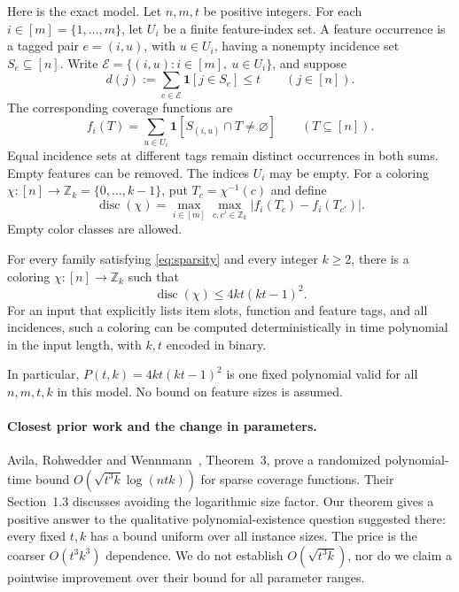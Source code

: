 \documentclass[acmsmall,11pt,nonacm]{acmart}
\newcommand{\ind}{\mathbf{1}}
\newcommand{\disc}{\operatorname{disc}}
\newcommand{\Zk}{\mathbb{Z}_k}
\newcommand{\calE}{\mathcal{E}}
\begin{document}
Here is the exact model. Let $n,m,t$ be positive integers. For each
$i\in[m]=\{1,\ldots,m\}$, let $U_i$ be a finite feature-index set. A feature
occurrence is a tagged pair $e=(i,u)$, with $u\in U_i$, having a nonempty
incidence set $S_e\subseteq[n]$. Write
$\calE=\{(i,u):i\in[m],\ u\in U_i\}$, and suppose
\begin{equation}
 d(j):=\sum_{e\in\calE}\ind[j\in S_e]\le t
 \qquad (j\in[n]).
 \label{eq:sparsity}
\end{equation}
The corresponding coverage functions are
\begin{equation}
 f_i(T)=\sum_{u\in U_i}\ind[S_{(i,u)}\cap T\ne\varnothing]
 \qquad (T\subseteq[n]).
 \label{eq:coverage}
\end{equation}
Equal incidence sets at different tags remain distinct occurrences in
both sums. Empty features can be removed. The indices $U_i$ may be empty.
For a coloring $\chi:[n]\to\Zk=\{0,\ldots,k-1\}$, put
$T_c=\chi^{-1}(c)$ and define
\[
 \disc(\chi)=\max_{i\in[m]}\max_{c,c'\in\Zk}
          |f_i(T_c)-f_i(T_{c'})|.
\]
Empty color classes are allowed.

\begin{theorem}
\label{thm:main}
For every family satisfying \eqref{eq:sparsity} and every integer $k\ge2$,
there is a coloring $\chi:[n]\to\Zk$ such that
\begin{equation}
 \disc(\chi)\le 4kt(kt-1)^2.
 \label{eq:bound}
\end{equation}
For an input that explicitly lists item slots, function and feature tags,
and all incidences, such a coloring can be computed deterministically in
time polynomial in the input length, with $k,t$ encoded in binary.
\end{theorem}

In particular, $P(t,k)=4kt(kt-1)^2$ is one fixed polynomial valid for all
$n,m,t,k$ in this model. No bound on feature sizes is assumed.

\paragraph{Closest prior work and the change in parameters.}
Avila, Rohwedder and Wennmann~\cite{ARW26}, Theorem~3, prove a randomized
polynomial-time bound
$O(\sqrt{t^3k}\log(ntk))$ for sparse coverage functions. Their
Section~1.3 discusses avoiding the logarithmic size factor. Our theorem
gives a positive answer to the qualitative polynomial-existence question
suggested there: every fixed $t,k$ has a bound uniform over all instance
sizes. The price is the coarser $O(t^3k^3)$ dependence. We do not establish
$O(\sqrt{t^3k})$, nor do we claim a pointwise improvement over their bound
for all parameter ranges.
\end{document}
